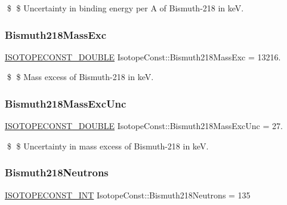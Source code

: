\$ \$ Uncertainty in binding energy per A of Bismuth-\/218 in keV. \mbox{\label{group___isotope_const-_bismuth-_bi218_ga25d8012733a8e12573b42ecfd4c5728d}} 
\subsubsection{\texorpdfstring{Bismuth218\+Mass\+Exc}{Bismuth218MassExc}}
{\footnotesize\ttfamily \mbox{\hyperlink{group___isotope_const-_macros_ga8f45a7272ce02c0b4c65c44636ed719a}{I\+S\+O\+T\+O\+P\+E\+C\+O\+N\+S\+T\+\_\+\+D\+O\+U\+B\+LE}} Isotope\+Const\+::\+Bismuth218\+Mass\+Exc = 13216.}

\$ \$ Mass excess of Bismuth-\/218 in keV. \mbox{\label{group___isotope_const-_bismuth-_bi218_ga4d3baf2e524adeb05322dc3b745c0e20}} 
\subsubsection{\texorpdfstring{Bismuth218\+Mass\+Exc\+Unc}{Bismuth218MassExcUnc}}
{\footnotesize\ttfamily \mbox{\hyperlink{group___isotope_const-_macros_ga8f45a7272ce02c0b4c65c44636ed719a}{I\+S\+O\+T\+O\+P\+E\+C\+O\+N\+S\+T\+\_\+\+D\+O\+U\+B\+LE}} Isotope\+Const\+::\+Bismuth218\+Mass\+Exc\+Unc = 27.}

\$ \$ Uncertainty in mass excess of Bismuth-\/218 in keV. \mbox{\label{group___isotope_const-_bismuth-_bi218_ga3a7dd1d83a43975898d46192b9614994}} 
\subsubsection{\texorpdfstring{Bismuth218\+Neutrons}{Bismuth218Neutrons}}
{\footnotesize\ttfamily \mbox{\hyperlink{group___isotope_const-_macros_ga5f18360b3e99483a35c32d789e62621c}{I\+S\+O\+T\+O\+P\+E\+C\+O\+N\+S\+T\+\_\+\+I\+NT}} Isotope\+Const\+::\+Bismuth218\+Neutrons = 135}

